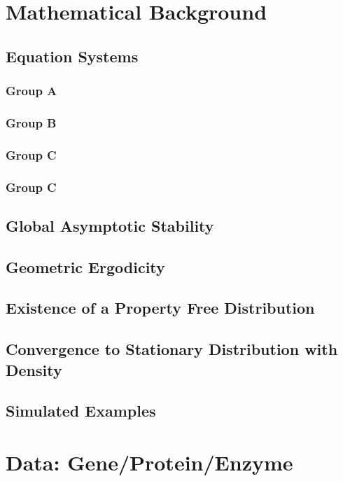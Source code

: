 \documentclass[preprint, 8pt]{elsarticle}
\theoremstyle{definition}
\begin{document}
\section{Mathematical Background}

\subsection{Equation Systems}

\subsubsection{Group A}

\subsubsection{Group B}

\subsubsection{Group C}

\subsubsection{Group C}

\subsection{Global Asymptotic Stability}
\subsection{Geometric Ergodicity}
\subsection{Existence of a Property Free Distribution}
\subsection{Convergence to Stationary Distribution with Density}
\subsection{Simulated Examples}

\section{Data: Gene/Protein/Enzyme}
\end{document}
